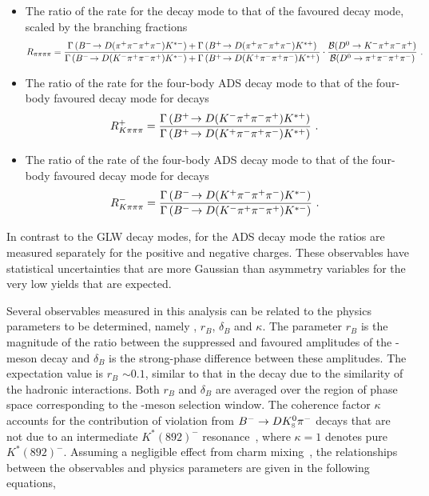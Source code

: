 \begin{itemize}
{{\begin{equation}
\label{eqn:Apipipipi}
\end{equation}
}}
\item{The ratio of the rate for the \decay{\D}{\pip\pim\pip\pim} decay mode to that of the favoured decay mode, scaled by the branching fractions
{\footnotesize
\begin{equation}
R_{\pi\pi\pi\pi} = \frac{\Gamma\left({{{B}^-}}\!\rightarrow {\ensuremath{D}}({{\pi}^+}{{\pi}^-}{{\pi}^+}{{\pi}^-}){{K}^{*-}}\right) + \Gamma\left({{{B}^+}}\!\rightarrow {\ensuremath{D}}({{\pi}^+}{{\pi}^-}{{\pi}^+}{{\pi}^-}){{K}^{*+}}\right)}{\Gamma\left({{{B}^-}}\!\rightarrow {\ensuremath{D}}({{K}^-}{{\pi}^+}{{\pi}^-}{{\pi}^+}){{K}^{*-}}\right) + \Gamma\left({{{B}^+}}\!\rightarrow {\ensuremath{D}}({{K}^+}{{\pi}^-}{{\pi}^+}{{\pi}^-}){{K}^{*+}}\right)} \cdot \frac{\mathcal{B}(D^0 \rightarrow {\ensuremath{{K}^-}}{\ensuremath{{\pi}^+}}{\ensuremath{{\pi}^-}}{\ensuremath{{\pi}^+}})}{\mathcal{B}(D^0 \rightarrow {\ensuremath{{\pi}^+}}{\ensuremath{{\pi}^-}}{\ensuremath{{\pi}^+}}{\ensuremath{{\pi}^-}})} \text{ . }
\label{eqn:Rpipipipi}
\end{equation}}
}
\item{The ratio of the rate for the four-body ADS decay mode to that of the four-body favoured decay mode for \Bp decays
{\footnotesize
\begin{equation}
R^+_{K\pi\pi\pi} = \frac{\Gamma\left({{{B}^+}}\!\rightarrow {\ensuremath{D}}({{K}^-}{{\pi}^+}{{\pi}^-}{{\pi}^+}){{K}^{*+}}\right)}{\Gamma\left({{{B}^+}}\!\rightarrow {\ensuremath{D}}({{K}^+}{{\pi}^-}{{\pi}^+}{{\pi}^-}){{K}^{*+}}\right)} \text{ . }
\label{eqn:Rplus4body}
\end{equation}
}}
\item{The ratio of the rate of the four-body ADS decay mode to that of the four-body favoured decay mode for \Bm decays
{\footnotesize
\begin{equation}
R^-_{K\pi\pi\pi} = \frac{\Gamma\left({{{B}^-}}\!\rightarrow {\ensuremath{D}}({{K}^+}{{\pi}^-}{{\pi}^+}{{\pi}^-}){{K}^{*-}}\right)}{\Gamma\left({{{B}^-}}\!\rightarrow {\ensuremath{D}}({{K}^-}{{\pi}^+}{{\pi}^-}{{\pi}^+}){{K}^{*-}}\right)} \text{ . }
\label{eqn:Rminus4body}
\end{equation}
}}
\end{itemize}

\noindent
In contrast to the GLW decay modes, for the ADS decay mode the ratios are measured separately for the positive and negative charges. These observables have statistical uncertainties that are more Gaussian than asymmetry variables for the very low yields that are expected. 

Several \CP observables measured in this analysis can be related to the physics parameters to be determined, namely \Pgamma, $r_B$, $\delta_B$ and $\kappa$. The parameter $r_B$ is the magnitude of the ratio between the suppressed and favoured amplitudes of the \B-meson decay and $\delta_B$ is the strong-phase difference between these amplitudes. The expectation value is $r_B$ $\sim 0.1$, similar to that in the \decay{\Bm}{\D\Km} decay due to the similarity of the hadronic interactions. Both $r_B$ and $\delta_B$ are averaged over the region of \D\KS\pim phase space corresponding to the \Kstarm-meson selection window. The coherence factor $\kappa$ accounts for the contribution of \CP violation from ${{{B}^-}} \rightarrow D {{K}^0_{\mathrm{ \scriptscriptstyle S}}} {{\pi}^-}$ decays that are not due to an intermediate $K^*(892)^{-}$ resonance~\cite{Gronau2003198}, where $\kappa = 1$ denotes pure $K^*(892)^{-}$. Assuming a negligible effect from charm mixing~\cite{charmmixing}, the relationships between the \CP observables and physics parameters are given in the following equations,

